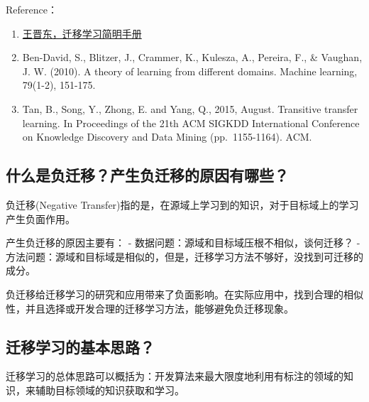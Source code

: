 Reference：

\begin{enumerate}
\def\labelenumi{\arabic{enumi}.}
\tightlist
\item
  \href{https：//github.com/jindongwang/transferlearning-tutorial}{王晋东，迁移学习简明手册}
\item
  Ben-David, S., Blitzer, J., Crammer, K., Kulesza, A., Pereira, F., \&
  Vaughan, J. W. (2010). A theory of learning from different domains.
  Machine learning, 79(1-2), 151-175.
\item
  Tan, B., Song, Y., Zhong, E. and Yang, Q., 2015, August. Transitive
  transfer learning. In Proceedings of the 21th ACM SIGKDD International
  Conference on Knowledge Discovery and Data Mining (pp.~1155-1164).
  ACM.
\end{enumerate}

\subsection{什么是负迁移？产生负迁移的原因有哪些？}\label{ux4ec0ux4e48ux662fux8d1fux8fc1ux79fbux4ea7ux751fux8d1fux8fc1ux79fbux7684ux539fux56e0ux6709ux54eaux4e9b}

负迁移(Negative
Transfer)指的是，在源域上学习到的知识，对于目标域上的学习产生负面作用。

产生负迁移的原因主要有： - 数据问题：源域和目标域压根不相似，谈何迁移？
-
方法问题：源域和目标域是相似的，但是，迁移学习方法不够好，没找到可迁移的成分。

负迁移给迁移学习的研究和应用带来了负面影响。在实际应用中，找到合理的相似性，并且选择或开发合理的迁移学习方法，能够避免负迁移现象。

\subsection{迁移学习的基本思路？}\label{ux8fc1ux79fbux5b66ux4e60ux7684ux57faux672cux601dux8def}

迁移学习的总体思路可以概括为：开发算法来最大限度地利用有标注的领域的知识，来辅助目标领域的知识获取和学习。

